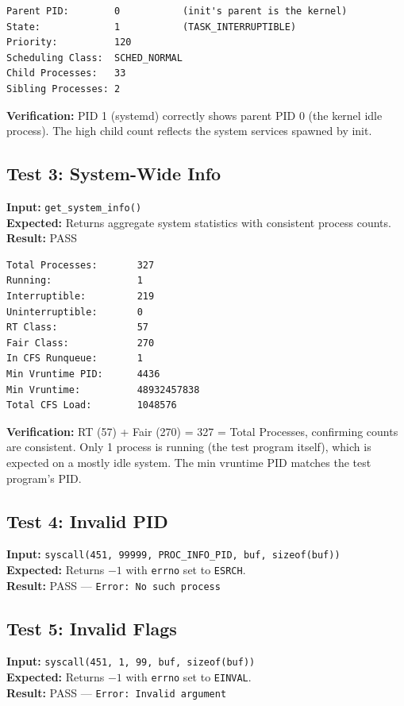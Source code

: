 \documentclass[12pt,a4paper]{article}
\begin{document}
\begin{lstlisting}
Parent PID:        0           (init's parent is the kernel)
State:             1           (TASK_INTERRUPTIBLE)
Priority:          120
Scheduling Class:  SCHED_NORMAL
Child Processes:   33
Sibling Processes: 2
\end{lstlisting}

\textbf{Verification:} PID 1 (systemd) correctly shows parent PID 0 (the kernel idle process). The high child count reflects the system services spawned by init.

\subsection*{Test 3: System-Wide Info}
\textbf{Input:} \texttt{get\_system\_info()} \\
\textbf{Expected:} Returns aggregate system statistics with consistent process counts. \\
\textbf{Result:} PASS

\begin{lstlisting}
Total Processes:       327
Running:               1
Interruptible:         219
Uninterruptible:       0
RT Class:              57
Fair Class:            270
In CFS Runqueue:       1
Min Vruntime PID:      4436
Min Vruntime:          48932457838
Total CFS Load:        1048576
\end{lstlisting}

\textbf{Verification:} RT (57) + Fair (270) = 327 = Total Processes, confirming counts are consistent. Only 1 process is running (the test program itself), which is expected on a mostly idle system. The min vruntime PID matches the test program's PID.

\subsection*{Test 4: Invalid PID}
\textbf{Input:} \texttt{syscall(451, 99999, PROC\_INFO\_PID, buf, sizeof(buf))} \\
\textbf{Expected:} Returns $-1$ with \texttt{errno} set to \texttt{ESRCH}. \\
\textbf{Result:} PASS --- \texttt{Error: No such process}

\subsection*{Test 5: Invalid Flags}
\textbf{Input:} \texttt{syscall(451, 1, 99, buf, sizeof(buf))} \\
\textbf{Expected:} Returns $-1$ with \texttt{errno} set to \texttt{EINVAL}. \\
\textbf{Result:} PASS --- \texttt{Error: Invalid argument}
\end{document}
